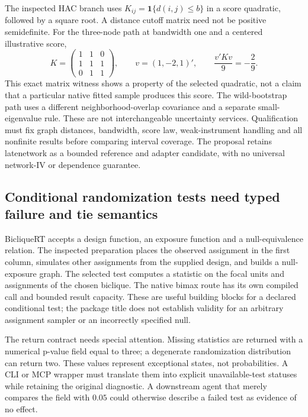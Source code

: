The inspected HAC branch uses $K_{ij}=\mathbf 1\{d(i,j)\le b\}$ in a score quadratic, followed by a square root. A distance cutoff matrix need not be positive semidefinite. For the three-node path at bandwidth one and a centered illustrative score,
\[
 K=\begin{pmatrix}1&1&0\\1&1&1\\0&1&1\end{pmatrix},
 \qquad v=(1,-2,1)',\qquad \frac{v'Kv}{9}=-\frac{2}{9}.
\]
This exact matrix witness shows a property of the selected quadratic, not a claim that a particular native fitted sample produces this score. The wild-bootstrap path uses a different neighborhood-overlap covariance and a separate small-eigenvalue rule. These are not interchangeable uncertainty services. Qualification must fix graph distances, bandwidth, score law, weak-instrument handling and all nonfinite results before comparing interval coverage. The proposal retains latenetwork as a bounded reference and adapter candidate, with no universal network-IV or dependence guarantee.\citep{exec25_rnet_late,exec25_rnet_choice}

\subsection{Conditional randomization tests need typed failure and tie semantics}

BicliqueRT accepts a design function, an exposure function and a null-equivalence relation. The inspected preparation places the observed assignment in the first column, simulates other assignments from the supplied design, and builds a null-exposure graph. The selected test computes a statistic on the focal units and assignments of the chosen biclique. The native bimax route has its own compiled call and bounded result capacity. These are useful building blocks for a declared conditional test; the package title does not establish validity for an arbitrary assignment sampler or an incorrectly specified null.\citep{exec25_rnet_biclique}

The return contract needs special attention. Missing statistics are returned with a numerical p-value field equal to three; a degenerate randomization distribution can return two. These values represent exceptional states, not probabilities. A CLI or MCP wrapper must translate them into explicit unavailable-test statuses while retaining the original diagnostic. A downstream agent that merely compares the field with $0.05$ could otherwise describe a failed test as evidence of no effect.\citep{exec25_rnet_biclique}

